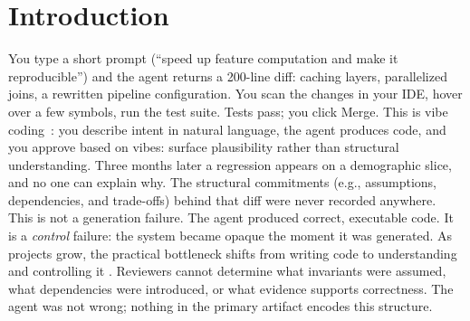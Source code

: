 \section{Introduction}
You type a short prompt (``speed up feature computation and make it reproducible'') and the agent returns a 200-line diff: caching layers, parallelized joins, a rewritten pipeline configuration.
You scan the changes in your IDE, hover over a few symbols, run the test suite.
Tests pass; you click Merge.
This is vibe coding~\cite{karpathy2025vibecoding}: you describe intent in natural language, the agent produces code, and you approve based on vibes: surface plausibility rather than structural understanding.
Three months later a regression appears on a demographic slice, and no one can explain why. The structural commitments (e.g., assumptions, dependencies, and trade-offs) behind that diff were never recorded anywhere.
This is not a generation failure. The agent produced correct, executable code.
It is a \emph{control} failure: the system became opaque the moment it was generated.
As projects grow, the practical bottleneck shifts from writing code to understanding and controlling it \cite{peng2023copilot,vaithilingam2022expectation}.
Reviewers cannot determine what invariants were assumed, what dependencies were introduced, or what evidence supports correctness. The agent was not wrong; nothing in the primary artifact encodes this structure.

